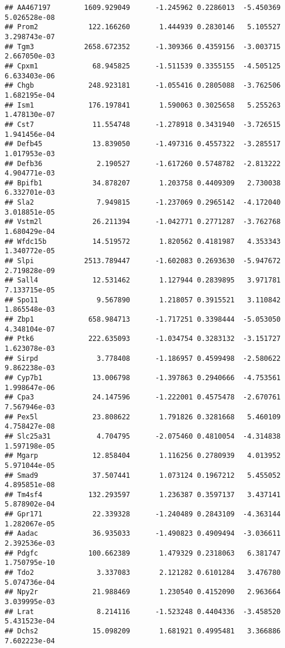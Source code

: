 \documentclass[
]{article}
\begin{document}
\begin{verbatim}
## AA467197        1609.929049      -1.245962 0.2286013  -5.450369 5.026528e-08
## Prom2            122.166260       1.444939 0.2830146   5.105527 3.298743e-07
## Tgm3            2658.672352      -1.309366 0.4359156  -3.003715 2.667050e-03
## Cpxm1             68.945825      -1.511539 0.3355155  -4.505125 6.633403e-06
## Chgb             248.923181      -1.055416 0.2805088  -3.762506 1.682195e-04
## Ism1             176.197841       1.590063 0.3025658   5.255263 1.478130e-07
## Cst7              11.554748      -1.278918 0.3431940  -3.726515 1.941456e-04
## Defb45            13.839050      -1.497316 0.4557322  -3.285517 1.017953e-03
## Defb36             2.190527      -1.617260 0.5748782  -2.813222 4.904771e-03
## Bpifb1            34.878207       1.203758 0.4409309   2.730038 6.332701e-03
## Sla2               7.949815      -1.237069 0.2965142  -4.172040 3.018851e-05
## Vstm2l            26.211394      -1.042771 0.2771287  -3.762768 1.680429e-04
## Wfdc15b           14.519572       1.820562 0.4181987   4.353343 1.340772e-05
## Slpi            2513.789447      -1.602083 0.2693630  -5.947672 2.719828e-09
## Sall4             12.531462       1.127944 0.2839895   3.971781 7.133715e-05
## Spo11              9.567890       1.218057 0.3915521   3.110842 1.865548e-03
## Zbp1             658.984713      -1.717251 0.3398444  -5.053050 4.348104e-07
## Ptk6             222.635093      -1.034754 0.3283132  -3.151727 1.623078e-03
## Sirpd              3.778408      -1.186957 0.4599498  -2.580622 9.862238e-03
## Cyp7b1            13.006798      -1.397863 0.2940666  -4.753561 1.998647e-06
## Cpa3              24.147596      -1.222001 0.4575478  -2.670761 7.567946e-03
## Pex5l             23.808622       1.791826 0.3281668   5.460109 4.758427e-08
## Slc25a31           4.704795      -2.075460 0.4810054  -4.314838 1.597198e-05
## Mgarp             12.858404       1.116256 0.2780939   4.013952 5.971044e-05
## Smad9             37.507441       1.073124 0.1967212   5.455052 4.895851e-08
## Tm4sf4           132.293597       1.236387 0.3597137   3.437141 5.878902e-04
## Gpr171            22.339328      -1.240489 0.2843109  -4.363144 1.282067e-05
## Aadac             36.935033      -1.490823 0.4909494  -3.036611 2.392536e-03
## Pdgfc            100.662389       1.479329 0.2318063   6.381747 1.750795e-10
## Tdo2               3.337083       2.121282 0.6101284   3.476780 5.074736e-04
## Npy2r             21.988469       1.230540 0.4152090   2.963664 3.039995e-03
## Lrat               8.214116      -1.523248 0.4404336  -3.458520 5.431523e-04
## Dchs2             15.098209       1.681921 0.4995481   3.366886 7.602223e-04

\end{verbatim}
\end{document}
